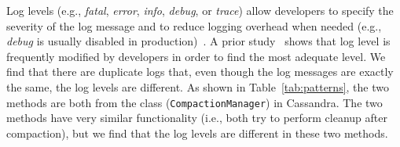  Log levels (e.g., {\em fatal}, {\em error}, {\em info}, {\em debug}, or {\em trace}) allow developers to specify the severity of the log message and to reduce logging overhead when needed (e.g., {\em debug} is usually disabled in production)~\cite{Li2017}. A prior study~\cite{Yuan:2012:CLP:2337223.2337236} shows that log level is frequently modified by developers in order to find the most adequate level. We find that there are duplicate logs that, even though the log messages are exactly the same, %
the log levels are different. 
As shown in Table~\ref{tab:patterns}, the two methods are both from the class ({\tt\small CompactionManager}) in Cassandra. The two methods have very similar functionality (i.e., both try to perform cleanup after compaction), but we find that the log levels are different in these two methods. %


